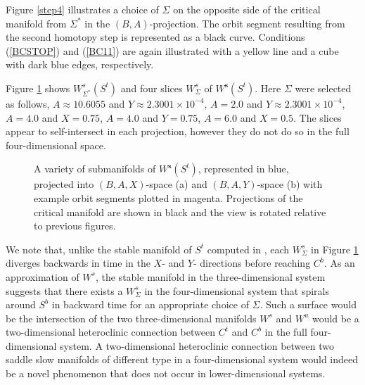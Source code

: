 \documentclass{ws-ijbc}
\begin{document}
Figure \ref{step4} illustrates a choice of $\Sigma$ on the opposite side of the critical manifold from $\Sigma^*$ in the $(B,A)$-projection.  The orbit segment resulting from the second homotopy step is represented as a black curve.  Conditions (\ref{BCSTOP}) and (\ref{BC11}) are again illustrated with a yellow line and a cube with dark blue edges, respectively.
    
Figure \ref{pieces} shows $W^s_{\Sigma^*}(S^t)$ and four slices $W^{s}_{\Sigma}$ of $W^{\mathbf{s}}(S^t)$.  Here $\Sigma$ were selected as follows, $A\approx10.6055$ and $Y\approx2.3001 \times 10^{-4}$, $A=2.0$ and $Y\approx2.3001 \times 10^{-4}$, $A=4.0$ and $X=0.75$, $A=4.0$ and $Y=0.75$, $A=6.0$ and $X=0.5$.  The slices appear to self-intersect in each projection, however they do not do so in the full four-dimensional space.  

\begin{figure}[h]
\centering
{}
\caption{A variety of submanifolds of $W^{\mathbf{s}}(S^t)$, represented in blue, projected into $(B,A,X)$-space (a) and $(B,A,Y)$-space (b) with example orbit segments plotted in magenta.  Projections of the critical manifold are shown in black and the view is rotated relative to previous figures.}
\label{pieces}
\end{figure}
    
We note that, unlike the stable manifold of $S^t$ computed in \cite{QSSA}, each $W^{s}_{\Sigma}$ in Figure \ref{pieces} diverges backwards in time in the $X$- and $Y$- directions before reaching $C^b$.  As an approximation of $W^s$, the stable manifold in the three-dimensional system suggests that there exists a $W^{s}_{\Sigma}$ in the four-dimensional system that spirals around $S^b$ in backward time for an appropriate choice of $\Sigma$.  Such a surface would be the intersection of the two three-dimensional manifolds $W^s$ and $W^u$ would be a two-dimensional heteroclinic connection between $C^t$ and $C^b$ in the full four-dimensional system.  A two-dimensional heteroclinic connection between two saddle slow manifolds of different type in a four-dimensional system would indeed be a novel phenomenon that does not occur in lower-dimensional systems.

\newpage

\end{document}
